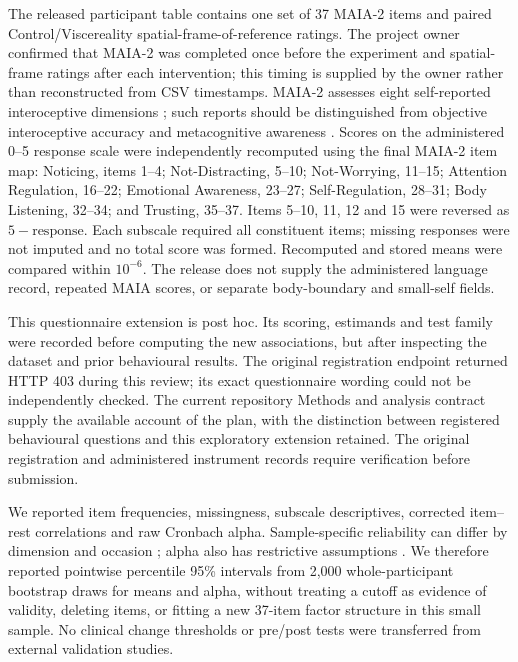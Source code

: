The released participant table contains one set of 37 MAIA-2 items and paired Control/Viscereality spatial-frame-of-reference ratings. The project owner confirmed that MAIA-2 was completed once before the experiment and spatial-frame ratings after each intervention; this timing is supplied by the owner rather than reconstructed from CSV timestamps. MAIA-2 assesses eight self-reported interoceptive dimensions \citep{Mehling2012,Mehling2018}; such reports should be distinguished from objective interoceptive accuracy and metacognitive awareness \citep{Garfinkel2015}. Scores on the administered 0--5 response scale were independently recomputed using the final MAIA-2 item map: Noticing, items 1--4; Not-Distracting, 5--10; Not-Worrying, 11--15; Attention Regulation, 16--22; Emotional Awareness, 23--27; Self-Regulation, 28--31; Body Listening, 32--34; and Trusting, 35--37. Items 5--10, 11, 12 and 15 were reversed as $5-\mathrm{response}$. Each subscale required all constituent items; missing responses were not imputed and no total score was formed. Recomputed and stored means were compared within $10^{-6}$. The release does not supply the administered language record, repeated MAIA scores, or separate body-boundary and small-self fields.

This questionnaire extension is post hoc. Its scoring, estimands and test family were recorded before computing the new associations, but after inspecting the dataset and prior behavioural results. The original registration endpoint returned HTTP 403 during this review; its exact questionnaire wording could not be independently checked. The current repository Methods and analysis contract supply the available account of the plan, with the distinction between registered behavioural questions and this exploratory extension retained. The original registration and administered instrument records require verification before submission.

We reported item frequencies, missingness, subscale descriptives, corrected item--rest correlations and raw Cronbach alpha. Sample-specific reliability can differ by dimension and occasion \citep{Eggart2021}; alpha also has restrictive assumptions \citep{McNeish2018}. We therefore reported pointwise percentile 95\% intervals from 2,000 whole-participant bootstrap draws for means and alpha, without treating a cutoff as evidence of validity, deleting items, or fitting a new 37-item factor structure in this small sample. No clinical change thresholds or pre/post tests were transferred from external validation studies.

